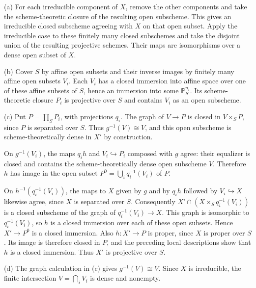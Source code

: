 (a) For each irreducible component of $X$, remove the other components and take the scheme-theoretic closure of the resulting open subscheme. This gives an irreducible closed subscheme agreeing with $X$ on that open subset. Apply the irreducible case to these finitely many closed subschemes and take the disjoint union of the resulting projective schemes. Their maps are isomorphisms over a dense open subset of $X$.

(b) Cover $S$ by affine open subsets and their inverse images by finitely many affine open subsets $V_i$. Each $V_i$ has a closed immersion into affine space over one of these affine subsets of $S$, hence an immersion into some $\mathbb P_S^{n_i}$. Its scheme-theoretic closure $P_i$ is projective over $S$ and contains $V_i$ as an open subscheme.

(c) Put $P=\prod_S P_i$, with projections $q_i$. The graph of $V\to P$ is closed in $V\times_S P$, since $P$ is separated over $S$. Thus $g^{-1}(V)\cong V$, and this open subscheme is scheme-theoretically dense in $X'$ by construction.

On $g^{-1}(V_i)$, the maps $q_i h$ and $V_i\hookrightarrow P_i$ composed with $g$ agree: their equalizer is closed and contains the scheme-theoretically dense open subscheme $V$. Therefore $h$ has image in the open subset $P^0=\bigcup_i q_i^{-1}(V_i)$ of $P$.

On $h^{-1}(q_i^{-1}(V_i))$, the maps to $X$ given by $g$ and by $q_i h$ followed by $V_i\hookrightarrow X$ likewise agree, since $X$ is separated over $S$. Consequently $X'\cap(X\times_S q_i^{-1}(V_i))$ is a closed subscheme of the graph of $q_i^{-1}(V_i)\to X$. This graph is isomorphic to $q_i^{-1}(V_i)$, so $h$ is a closed immersion over each of these open subsets. Hence $X'\to P^0$ is a closed immersion. Also $h:X'\to P$ is proper, since $X$ is proper over $S$. Its image is therefore closed in $P$, and the preceding local descriptions show that $h$ is a closed immersion. Thus $X'$ is projective over $S$.

(d) The graph calculation in (c) gives $g^{-1}(V)\cong V$. Since $X$ is irreducible, the finite intersection $V=\bigcap_i V_i$ is dense and nonempty.
